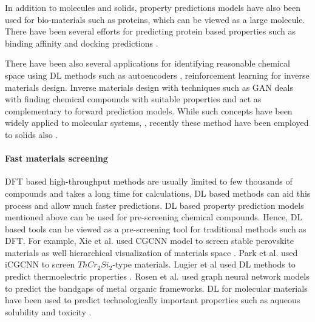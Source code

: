 \documentclass[pdflatex,sn-mathphys]{sn-jnl}%
\theoremstyle{thmstyleone}%
\theoremstyle{thmstyletwo}%
\theoremstyle{thmstylethree}%
\begin{document}
 In addition to molecules and solids, property predictions models have also been used for bio-materials such as proteins, which can be viewed as a large molecule. There have been several efforts for predicting protein based properties such as binding affinity \cite{dgllife} and docking predictions \cite{mcnutt2021gnina}.

  
There have been also several applications for identifying reasonable chemical space using DL methods such as autoencoders \cite{jin2018junction}, reinforcement learning \cite{olivecrona2017molecular,you2018graph,putin2018reinforced} for inverse materials design. Inverse materials design with techniques such as GAN deals with finding chemical compounds with suitable properties and act as complementary to forward prediction models. While such concepts have been widely applied to molecular systems, \cite{sanchez2017optimizing}, recently these method have been employed to solids also \cite{nouira2018crystalgan,Long2021,Noh2019,Kim2020,long2021inverse}. 

 \paragraph{Fast materials screening}
 DFT based high-throughput methods are usually limited to few thousands of compounds and takes a long time for calculations, DL based methods can aid this process and allow much faster predictions. DL based property prediction models mentioned above can be used for pre-screening chemical compounds. Hence, DL based tools can be viewed as a pre-screening tool for traditional methods such as DFT. For example, Xie et al. used CGCNN model to screen stable perovskite materials \cite{xie2018crystal} as well hierarchical visualization of materials
space \cite{xie2018hierarchical}.
Park et al. \cite{park2020developing} used iCGCNN to screen $ThCr_2Si_2$-type materials. Lugier et al used DL methods to predict thermoelectric properties \cite {laugier2018predicting}. Rosen et al.
\cite{rosen2021machine} used graph neural network models to predict the bandgaps of metal organic frameworks.
DL for molecular materials have been used to predict technologically important properties such as aqueous solubility \cite{lusci2013deep} and toxicity \cite{xu2015deep}.
\end{document}

